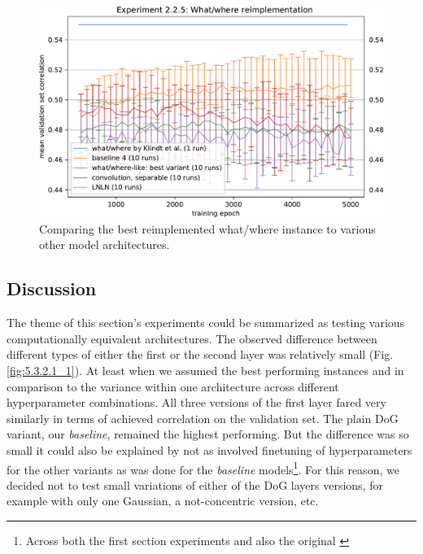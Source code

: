 \begin{figure}[H]
    \centering
    \includegraphics[width=1\textwidth]{../figures/05_2_2_5}
    \caption[Experiment 2.2.5]{Comparing the best reimplemented what/where instance to various other model architectures\protect\footnotemark.}
    \label{fig:5.2.2.5}
\end{figure}

\subsection{Discussion}

The theme of this section’s experiments could be summarized as testing various computationally equivalent architectures. The observed difference between different types of either the first or the second layer was relatively small (Fig. \ref{fig:5.3.2.1_1}). At least when we assumed the best performing instances and in comparison to the variance within one architecture across different hyperparameter combinations. All three versions of the first layer fared very similarly in terms of achieved correlation on the validation set. The {plain DoG variant}, our \textit{baseline}, remained the highest performing. But the difference was so small it could also be explained by not as involved finetuning of hyperparameters for the other variants as was done for the \textit{baseline} models\footnote{Across both the first section experiments and also the original \cite{antolik}}. For this reason, we decided not to test small variations of either of the DoG layers versions, for example with only one Gaussian, a not-concentric version, etc. 

